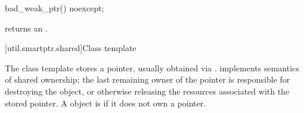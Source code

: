 %
%
\begin{itemdecl}
bad_weak_ptr() noexcept;
\end{itemdecl}

\begin{itemdescr}
\pnum\postconditions  {} returns an
 \ntbs.

\end{itemdescr}

[util.smartptr.shared]{Class template }

\pnum
{}%
The  class template stores a pointer, usually obtained
via .  implements semantics of shared ownership;
the last remaining owner of the pointer is responsible for destroying
the object, or otherwise releasing the resources associated with the stored pointer. A
 object is  if it does not own a pointer.


